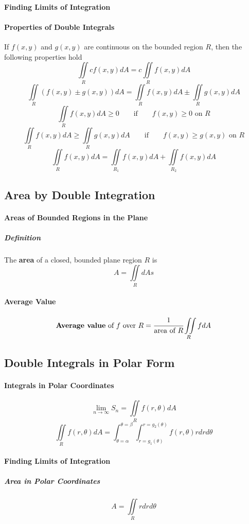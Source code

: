 \documentclass{article}
\begin{document}
            \paragraph{Finding Limits of Integration}
            \paragraph{Properties of Double Integrals}
                If $f(x,y)$ and $g(x,y)$ are continuous on the bounded region $R$, then the following properties hold
                \[\iint\limits_Rcf(x,y)dA=c\iint\limits_Rf(x,y)dA\]
                \[\iint\limits_R(f(x,y)\pm g(x,y))dA=\iint\limits_Rf(x,y)dA\pm\iint\limits_Rg(x,y)dA\]
                \[\iint\limits_Rf(x,y)dA\ge 0\qquad\text{if}\qquad f(x,y)\ge 0\text{ on }R\]
                \[\iint\limits_Rf(x,y)dA\ge \iint\limits_Rg(x,y)dA\qquad\text{if}\qquad f(x,y)\ge g(x,y)\text{ on }R\]
                \[\iint\limits_Rf(x,y)dA=\iint\limits_{R_1}f(x,y)dA+\iint\limits_{R_2}f(x,y)dA\]
        \subsection{Area by Double Integration}
            \paragraph{Areas of Bounded Regions in the Plane}
                \subparagraph{Definition} The \textbf{area} of a closed, bounded plane region $R$ is
                \[A=\iint\limits_RdAs\]
            \paragraph{Average Value}
                \[\textbf{Average value}\text{ of }f\text{ over }R=\cfrac{1}{\text{area of }R}\iint\limits_R fdA\]
        \subsection{Double Integrals in Polar Form}
            \paragraph{Integrals in Polar Coordinates}
                \[\lim\limits_{n\to\infty}S_n=\iint\limits_Rf(r,\theta)dA\]
                \[\iint\limits_Rf(r,\theta)dA=\int_{\theta=\alpha}^{\theta=\beta}\int_{r=g_1(\theta)}^{r=g_2(\theta)}f(r,\theta)rdrd\theta\]
            \paragraph{Finding Limits of Integration}
                \subparagraph{Area in Polar Coordinates}
                \[A=\iint\limits_Rrdrd\theta\]
\end{document}
